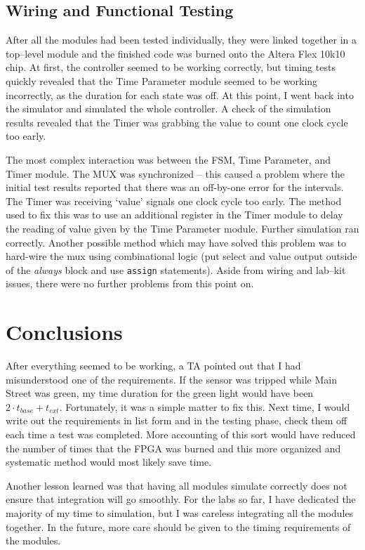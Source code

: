 \documentclass{article}
\begin{document}
	\subsection{Wiring and Functional Testing}
	After all the modules had been tested individually, they were linked
	together in a top--level module and the finished code was burned onto
	the Altera Flex 10k10 chip.  At first, the controller seemed to be
	working correctly, but timing tests quickly revealed that the Time Parameter
	module seemed to be working incorrectly, as the duration for each state
	was off.  At this point, I went back into the simulator and simulated
	the whole controller.  A check of the simulation results revealed that
	the Timer was grabbing the value to count one clock cycle too early.

	The most complex interaction was between the FSM, Time Parameter, and
	Timer module.  The MUX was synchronized -- this caused a problem where
	the initial test results reported that there was an off-by-one error
	for the intervals.  The Timer was receiving `value' signals one clock
	cycle too early.  The method used to fix this was to use an additional
	register in the Timer module to delay the reading of value given by the
	Time Parameter module.  Further simulation ran correctly.  Another possible
	method which may have solved this problem was to hard-wire the mux using
	combinational logic (put select and value output outside of the
	\emph{always} block and use \texttt{assign} statements).  Aside from wiring
	and lab--kit issues, there were no further problems from this point on.


\section{Conclusions}
	After everything seemed to be working, a TA pointed out that I had
	misunderstood one of the requirements.  If the sensor was tripped
	while Main Street was green, my time duration for the green light would
	have been $2 \cdot t_{base} + t_{ext}$.  Fortunately, it was a simple
	matter to fix this.  Next time, I would write out the requirements in list
	form and in the testing phase, check them off each time a test was
	completed.  More accounting of this sort would have reduced the number of
	times that the FPGA was burned and this more organized and systematic
	method would most likely save time.

	Another lesson learned was that having all modules simulate correctly does
	not ensure that integration will go smoothly.  For the labs so far, I have
	dedicated the majority of my time to simulation, but I was careless
	integrating all the modules together.  In the future, more care should
	be given to the timing requirements of the modules.
\end{document}
